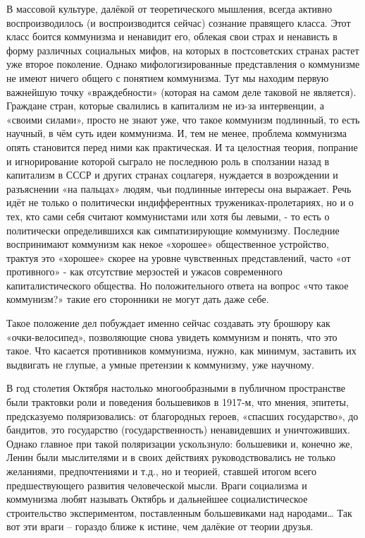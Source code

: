 \documentclass[12pt,a4paper,openany]{book}
\begin{document}
В массовой культуре, далёкой от теоретического мышления, всегда активно воспроизводилось (и воспроизводится сейчас) сознание правящего класса. Этот класс боится коммунизма и ненавидит его, облекая свои страх и ненависть в форму различных социальных мифов, на которых в постсоветских странах растет уже второе поколение. Однако мифологизированные представления о коммунизме не имеют ничего общего с понятием коммунизма. Тут мы находим первую важнейшую точку «враждебности» (которая на самом деле таковой не является). Граждане стран, которые свалились в капитализм не из-за интервенции, а «своими силами», просто не знают уже, что такое коммунизм подлинный, то есть научный, в чём суть идеи коммунизма. И, тем не менее, проблема коммунизма опять становится перед ними как практическая. И та целостная теория, попрание и игнорирование которой сыграло не последнюю роль в сползании назад в капитализм в СССР и других странах соцлагеря, нуждается в возрождении и разъяснении «на пальцах» людям, чьи подлинные интересы она выражает. Речь идёт не только о политически индифферентных тружениках-пролетариях, но и о тех, кто сами себя считают коммунистами или хотя бы левыми, - то есть о политически определившихся как симпатизирующие коммунизму. Последние воспринимают коммунизм как некое «хорошее» общественное устройство, трактуя это «хорошее» скорее на уровне чувственных представлений, часто «от противного» - как отсутствие мерзостей и ужасов современного капиталистического общества. Но положительного ответа на вопрос «что такое коммунизм?» такие его сторонники не могут дать даже себе.

Такое положение дел побуждает именно сейчас создавать эту брошюру как «очки-велосипед», позволяющие снова увидеть коммунизм и понять, что это такое. Что касается противников коммунизма, нужно, как минимум, заставить их выдвигать не глупые, а умные претензии к коммунизму, уже научному.

В год столетия Октября настолько многообразными в публичном пространстве были трактовки роли и поведения большевиков в 1917-м, что мнения, эпитеты, предсказуемо поляризовались: от благородных героев, «спасших государство», до бандитов, это государство (государственность) ненавидевших и уничтоживших. Однако главное при такой поляризации ускользнуло: большевики и, конечно же, Ленин были мыслителями и в своих действиях руководствовались не только желаниями, предпочтениями и т.д., но и теорией, ставшей итогом всего предшествующего развития человеческой мысли. Враги социализма и коммунизма любят называть Октябрь и дальнейшее социалистическое строительство экспериментом, поставленным большевиками над народами… Так вот эти враги – гораздо ближе к истине, чем далёкие от теории друзья.
\end{document}
